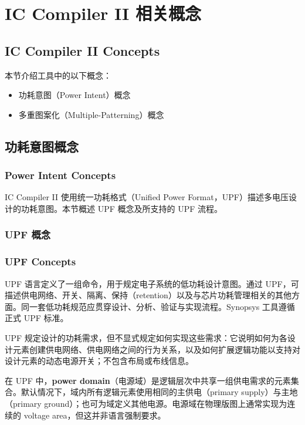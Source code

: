 \section{IC Compiler II 相关概念}
\subsection*{IC Compiler II Concepts}

本节介绍工具中的以下概念：
\begin{itemize}
  \item 功耗意图（Power Intent）概念
  \item 多重图案化（Multiple-Patterning）概念
\end{itemize}

\subsection{功耗意图概念}
\subsubsection*{Power Intent Concepts}

IC Compiler II 使用统一功耗格式（Unified Power Format，UPF）描述多电压设计的功耗意图。本节概述 UPF 概念及所支持的 UPF 流程。

\subsubsection{UPF 概念}
\subsubsection*{UPF Concepts}

UPF 语言定义了一组命令，用于规定电子系统的低功耗设计意图。通过 UPF，可描述供电网络、开关、隔离、保持（retention）以及与芯片功耗管理相关的其他方面。同一套低功耗规范应贯穿设计、分析、验证与实现流程。Synopsys 工具遵循正式 UPF 标准。

UPF 规定设计的功耗需求，但不显式规定如何实现这些需求：它说明如何为各设计元素创建供电网络、供电网络之间的行为关系，以及如何扩展逻辑功能以支持对设计元素的动态电源开关；不包含布局或布线信息。

在 UPF 中，\textbf{power domain}（电源域）是逻辑层次中共享一组供电需求的元素集合。默认情况下，域内所有逻辑元素使用相同的主供电（primary supply）与主地（primary ground）；也可为域定义其他电源。电源域在物理版图上通常实现为连续的 voltage area，但这并非语言强制要求。

